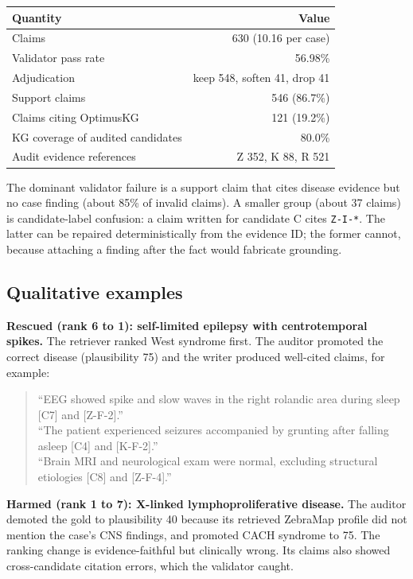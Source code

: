\documentclass[11pt,a4paper]{article}
\newcommand{\code}[1]{\texttt{\small #1}}
\begin{document}
\begin{center}
\begin{tabular}{lr}
\toprule
Quantity & Value\\
\midrule
Claims & 630 (10.16 per case)\\
Validator pass rate & 56.98\%\\
Adjudication & keep 548, soften 41, drop 41\\
Support claims & 546 (86.7\%)\\
Claims citing OptimusKG & 121 (19.2\%)\\
KG coverage of audited candidates & 80.0\%\\
Audit evidence references & Z 352, K 88, R 521\\
\bottomrule
\end{tabular}
\end{center}

The dominant validator failure is a support claim that cites disease evidence but
no case finding (about 85\% of invalid claims). A smaller group (about 37 claims)
is candidate-label confusion: a claim written for candidate C cites \code{Z-I-*}.
The latter can be repaired deterministically from the evidence ID; the former
cannot, because attaching a finding after the fact would fabricate grounding.

\subsection{Qualitative examples}

\textbf{Rescued (rank 6 to 1): self-limited epilepsy with centrotemporal spikes.}
The retriever ranked West syndrome first. The auditor promoted the correct disease
(plausibility 75) and the writer produced well-cited claims, for example:
\begin{quote}\small
``EEG showed spike and slow waves in the right rolandic area during sleep [C7] and
[Z-F-2].''\\
``The patient experienced seizures accompanied by grunting after falling asleep
[C4] and [K-F-2].''\\
``Brain MRI and neurological exam were normal, excluding structural etiologies
[C8] and [Z-F-4].''
\end{quote}

\textbf{Harmed (rank 1 to 7): X-linked lymphoproliferative disease.}
The auditor demoted the gold to plausibility 40 because its retrieved ZebraMap
profile did not mention the case's CNS findings, and promoted CACH syndrome to 75.
The ranking change is evidence-faithful but clinically wrong. Its claims also
showed cross-candidate citation errors, which the validator caught.
\end{document}
